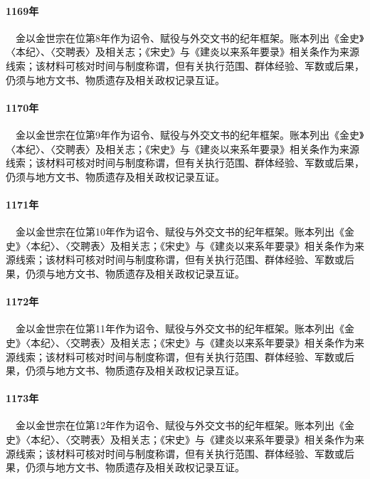 \paragraph{1169年}　金以金世宗在位第8年作为诏令、赋役与外交文书的纪年框架。账本列出《金史》〈本纪〉、〈交聘表〉及相关志；《宋史》与《建炎以来系年要录》相关条作为来源线索；该材料可核对时间与制度称谓，但有关执行范围、群体经验、军数或后果，仍须与地方文书、物质遗存及相关政权记录互证。

\paragraph{1170年}　金以金世宗在位第9年作为诏令、赋役与外交文书的纪年框架。账本列出《金史》〈本纪〉、〈交聘表〉及相关志；《宋史》与《建炎以来系年要录》相关条作为来源线索；该材料可核对时间与制度称谓，但有关执行范围、群体经验、军数或后果，仍须与地方文书、物质遗存及相关政权记录互证。

\paragraph{1171年}　金以金世宗在位第10年作为诏令、赋役与外交文书的纪年框架。账本列出《金史》〈本纪〉、〈交聘表〉及相关志；《宋史》与《建炎以来系年要录》相关条作为来源线索；该材料可核对时间与制度称谓，但有关执行范围、群体经验、军数或后果，仍须与地方文书、物质遗存及相关政权记录互证。

\paragraph{1172年}　金以金世宗在位第11年作为诏令、赋役与外交文书的纪年框架。账本列出《金史》〈本纪〉、〈交聘表〉及相关志；《宋史》与《建炎以来系年要录》相关条作为来源线索；该材料可核对时间与制度称谓，但有关执行范围、群体经验、军数或后果，仍须与地方文书、物质遗存及相关政权记录互证。

\paragraph{1173年}　金以金世宗在位第12年作为诏令、赋役与外交文书的纪年框架。账本列出《金史》〈本纪〉、〈交聘表〉及相关志；《宋史》与《建炎以来系年要录》相关条作为来源线索；该材料可核对时间与制度称谓，但有关执行范围、群体经验、军数或后果，仍须与地方文书、物质遗存及相关政权记录互证。

